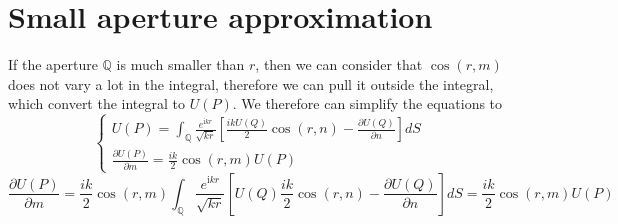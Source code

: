 \documentclass[12pt,twoside,english]{book}
\renewcommand{\~}{\perispomeni}%
\numberwithin{equation}{section}
\numberwithin{figure}{section}
\begin{document}
\section{Small aperture approximation}
If the aperture $\mathbb{Q}$ is much smaller than $r$, then we can consider that $\cos\left(r,m\right)$ does not vary a lot in the integral, therefore we can pull it outside the integral, which convert the integral to $U\left(P\right)$. We therefore can simplify the equations to
\begin{equation}
\begin{cases}
U\left(P\right)=\int_{\mathbb{Q}}\frac{e^{\text{i}kr}}{\sqrt{kr}}\left[\frac{ikU\left(Q\right)}{2}\cos\left(r,n\right)-\frac{\partial U\left(Q\right)}{\partial n}\right]dS\\
\frac{\partial U\left(P\right)}{\partial m}=\frac{ik}{2}\cos\left(r,m\right)U\left(P\right)\end{cases}\end{equation}
\begin{equation}
\frac{\partial U\left(P\right)}{\partial m}=\frac{ik}{2}\cos\left(r,m\right)\int_{\mathbb{Q}}\frac{e^{\text{i}kr}}{\sqrt{kr}}\left[U\left(Q\right)\frac{ik}{2}\cos\left(r,n\right)-\frac{\partial U\left(Q\right)}{\partial n}\right]dS=\frac{ik}{2}\cos\left(r,m\right)U\left(P\right)\end{equation}
\end{document}
